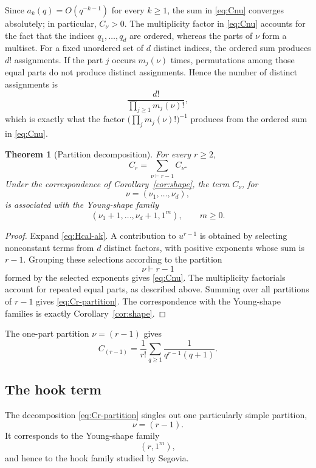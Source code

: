 \documentclass[11pt]{article}
\newtheorem{theorem}{Theorem}[section]
\theoremstyle{definition}
\begin{document}
Since $a_k(q)=O(q^{-k-1})$ for every $k\geq1$, the sum in
\eqref{eq:Cnu} converges absolutely; in particular, $C_\nu>0$.
The multiplicity factor in \eqref{eq:Cnu} accounts for the fact that
the indices $q_1,\ldots,q_d$ are ordered, whereas the parts of
$\nu$ form a multiset.  For a fixed unordered set of $d$ distinct
indices, the ordered sum produces $d!$ assignments.  If the part
$j$ occurs $m_j(\nu)$ times, permutations among those equal parts
do not produce distinct assignments.  Hence the number of distinct
assignments is
\[
        \frac{d!}{\prod_{j\geq1}m_j(\nu)!},
\]
which is exactly what the factor
$\bigl(\prod_j m_j(\nu)!\bigr)^{-1}$ produces from the ordered
sum in \eqref{eq:Cnu}.

\begin{theorem}[Partition decomposition]
\label{thm:partitiondecomp}
For every $r\geq2$,
\begin{equation}\label{eq:Cr-partition}
        C_r
        =
        \sum_{\nu\vdash r-1}C_\nu.
\end{equation}
Under the correspondence of Corollary~\ref{cor:shape}, the term
$C_\nu$, for
\[
        \nu=(\nu_1,\ldots,\nu_d),
\]
is associated with the Young-shape family
\[
        (\nu_1+1,\ldots,\nu_d+1,1^m),
        \qquad m\geq0.
\]
\end{theorem}

\begin{proof}
Expand \eqref{eq:Hcal-ak}.  A contribution to $u^{r-1}$ is obtained
by selecting nonconstant terms from $d$ distinct factors, with
positive exponents whose sum is $r-1$.  Grouping these selections
according to the partition
\[
        \nu\vdash r-1
\]
formed by the selected exponents gives \eqref{eq:Cnu}.  The
multiplicity factorials account for repeated equal parts, as
described above.  Summing over all partitions of $r-1$ gives
\eqref{eq:Cr-partition}.  The correspondence with the Young-shape
families is exactly Corollary~\ref{cor:shape}.
\end{proof}

The one-part partition $\nu=(r-1)$ gives
\[
        C_{(r-1)}
        =
        \frac1{r!}
        \sum_{q\geq1}\frac1{q^{r-1}(q+1)}.
\]

\subsection{The hook term}

The decomposition \eqref{eq:Cr-partition} singles out one particularly
simple partition,
\[
        \nu=(r-1).
\]
It corresponds to the Young-shape family
\[
        (r,1^m),
\]
and hence to the hook family studied by Segovia.
\end{document}
